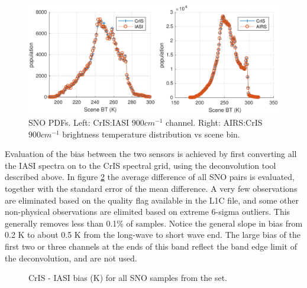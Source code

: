 \documentclass[twocolumn,10pt]{article}
\begin{document}
\begin{figure}[htb]
\centering
\includegraphics[width=\linewidth]{./figs/AC_IC_jplSNO_900wn_hist.pdf}
\caption{
  SNO PDFs. Left: CrIS:IASI $900 cm^{-1}$ channel. Right: AIRS:CrIS $900 cm^{-1}$ brightness temperature distribution vs scene bin.}
\label{fig:X2}
\end{figure}

Evaluation of the bias between the two sensors is achieved by first converting all the
IASI spectra on to the CrIS spectral grid, using the deconvolution tool described above.
In figure \ref{fig:X3} the average difference of all SNO pairs
is evaluated, together with the standard error of the mean difference. A very few
observations are eliminated based on the quality flag available in the L1C file, and some other non-physical observations are elimited based on extreme 6-sigma outliers. This generally removes less than  0.1\%  of samples. Notice the general slope in bias from 0.2 K to about 0.5 K from the long-wave to short wave end. The large bias of the first two or three channels at the ends of this band reflect the band edge limit of the deconvolution, and are not used.

\begin{figure}[htb]
  \centering
  \caption{CrIS - IASI bias (K) for all SNO samples from the set.}
  \label{fig:X3}
\end{figure}
\end{document}
